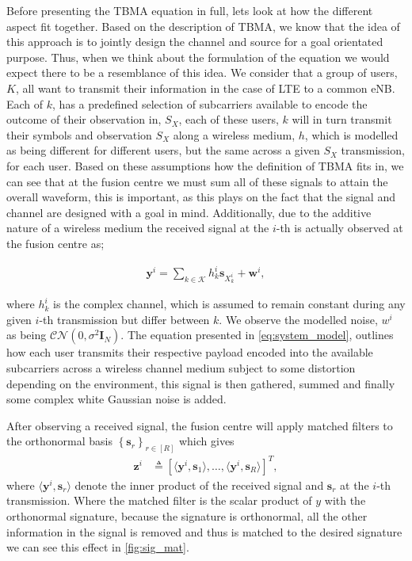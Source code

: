 \documentclass{article}
\begin{document}
Before presenting the TBMA equation in full, lets look at how the different aspect fit together. Based on the description of TBMA, we know that the idea of this approach is to jointly design the channel and source for a goal orientated purpose. Thus, when we think about the formulation of the equation we would expect there to be a resemblance of this idea.  We consider that a group of users, $K$, all want to transmit their information in the case of LTE to a common eNB. Each of $k$, has a predefined selection of subcarriers available to encode the outcome of their observation in, $S_X$, each of these users, $k$ will in turn transmit their symbols and observation $S_X$ along a wireless medium, $h$, which is modelled as being different for different users, but the same across a given $S_X$ transmission, for each user. Based on these assumptions how the definition of TBMA fits in, we can see that at the fusion centre we must sum all of these signals to attain the overall waveform, this is important, as this plays on the fact that the signal and channel are designed with a goal in mind. Additionally, due to the additive nature of a wireless medium the received signal at the $i$-th is actually observed at the fusion centre as;

\begin{align}
    \boldsymbol{y}^i = \sum_{k \in \mathcal{K}} h^i_k \boldsymbol{s}_{X^i_k} + \boldsymbol{w}^i, \label{eq:system_model}
\end{align}

where $h_k^i$ is the complex channel, which is assumed to remain constant during any given $i$-th transmission but differ between $k$. We observe the modelled noise, $w^i$ as being $\mathcal{CN}(0, \sigma^2 \boldsymbol{I}_N)$. The equation presented in \cref{eq:system_model}, outlines how each user transmits their respective payload encoded into the available subcarriers across a wireless channel medium subject to some distortion depending on the environment, this signal is then gathered, summed and finally some complex white Gaussian noise is added.


After observing a received signal, the fusion centre will apply matched filters to the orthonormal basis $\left\{ \boldsymbol{s}_r\right\}_{r \in [R]}$ which gives
%
\begin{align}
    \boldsymbol{z}^i &\triangleq \left[\langle \boldsymbol{y}^i, \boldsymbol{s}_1\rangle, \ldots, \langle \boldsymbol{y}^i, \boldsymbol{s}_R\rangle  \right]^T, \label{eq:mf_output}
\end{align}
%
where $\langle \boldsymbol{y}^i, \boldsymbol{s}_r\rangle$ denote the inner product of the received signal and $\boldsymbol{s}_r$ at the $i$-th transmission. Where the matched filter is the scalar product of $y$ with the orthonormal signature, because the signature is orthonormal, all the other information in the signal is removed and thus is matched to the desired signature we can see this effect in \cref{fig:sig_mat}. 
\end{document}
